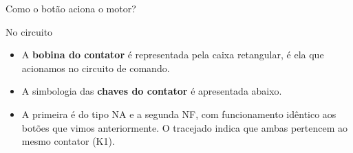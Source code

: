 \begin{frame}{Como o botão aciona o motor?}
\begin{block}{No circuito}
\begin{itemize}
	\item A \textbf{bobina do contator} é representada pela caixa retangular, é ela que acionamos no circuito de comando.
\end{itemize}
\end{block}
\begin{center}
\end{center}
\begin{block}{}
\begin{itemize}
	\item A simbologia das \textbf{chaves do contator} é apresentada abaixo.
\end{itemize}
\end{block}
\begin{center}
\end{center}
\begin{block}{}
\begin{itemize}
	\item A primeira é do tipo NA e a segunda NF, com funcionamento idêntico aos botões que vimos anteriormente. O tracejado indica que ambas pertencem ao mesmo contator (K1).
\end{itemize}
\end{block}
\end{frame}


